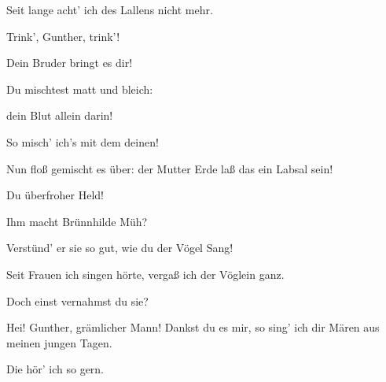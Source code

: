 \begin{drama}
Seit lange acht' ich des Lallens nicht mehr.
 



Trink', Gunther, trink'!
 

Dein Bruder bringt es dir!
 

\Guntherspeaks



Du mischtest matt und bleich:


dein Blut allein darin!
 

\Siegfriedspeaks



So misch' ich's mit dem deinen!


Nun floß gemischt es über:
der Mutter Erde laß das ein Labsal sein!
 

\Guntherspeaks



Du überfroher Held!
 

\Siegfriedspeaks



Ihm macht Brünnhilde Müh?
 

\Hagenspeaks



Verstünd' er sie so gut,
wie du der Vögel Sang!
 

\Siegfriedspeaks

Seit Frauen ich singen hörte,
vergaß ich der Vöglein ganz.
 

\Hagenspeaks

Doch einst vernahmst du sie?
 

\Siegfriedspeaks



Hei! Gunther, grämlicher Mann!
Dankst du es mir,
so sing' ich dir Mären
aus meinen jungen Tagen.
 

\Guntherspeaks

Die hör' ich so gern.
 





\end{drama}
